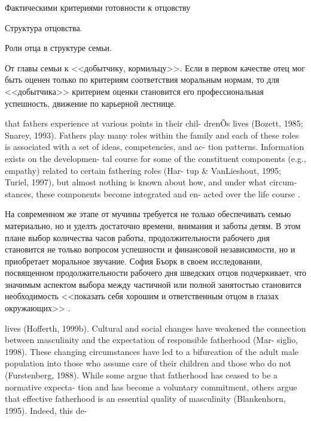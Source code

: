 \documentclass{../../common/thesisbyxetex}
\begin{document}
Фактическими критериями готовности  к отцовству








Структура отцовства.

Роли отца в структуре семьи.


От главы семьи к <<добытчику, кормильцу>>. Если в первом качестве отец мог быть оценен только по
критериям
соответствия моральным нормам, то для <<добытчика>> критерием оценки становится его 
профессиональная успешность, движение по карьерной лестнице. 

that fathers experience at various points in their chil-
drenÕs lives (Bozett, 1985; Snarey, 1993). Fathers play
many roles within the family and each of these roles is
associated with a set of ideas, competencies, and ac-
tion patterns. Information exists on the developmen-
tal course for some of the constituent components
(e.g., empathy) related to certain fathering roles (Har-
tup \& VanLieshout, 1995; Turiel, 1997), but almost
nothing is known about how, and under what circum-
stances, these components become integrated and en-
acted over the life course \cite[131]{f21}.


На современном же этапе от мучины требуется не только обеспечивать семью материально, но и уделть 
достаточно времени, внимания и заботы детям. В этом плане выбор количества часов работы, 
продолжительности рабочего дня становится не только вопросом успешности и финансовой независимости, 
но и приобретает моральное звучание. София Бъорк в своем исследовании, посвященном  
продолжительности рабочего дня шведских отцов подчеркивает, что значимым аспектом  выбора 
между частичной или полной занятостью становится необходимость <<показать себя хорошим и 
ответственным отцом в глазах окружающих>> \cite[221]{morfat}.


lives (Hofferth, 1999b). Cultural and social changes
have weakened the connection between masculinity
and the expectation of responsible fatherhood (Mar-
siglio, 1998). These changing circumstances have led
to a bifurcation of the adult male population into
those who assume care of their children and those
who do not (Furstenberg, 1988). While some argue
that fatherhood has ceased to be a normative expecta-
tion and has become a voluntary commitment, others
argue that effective fatherhood is an essential quality
of masculinity (Blankenhorn, 1995). Indeed, this de-
\cite[132]{f21}
\end{document}
